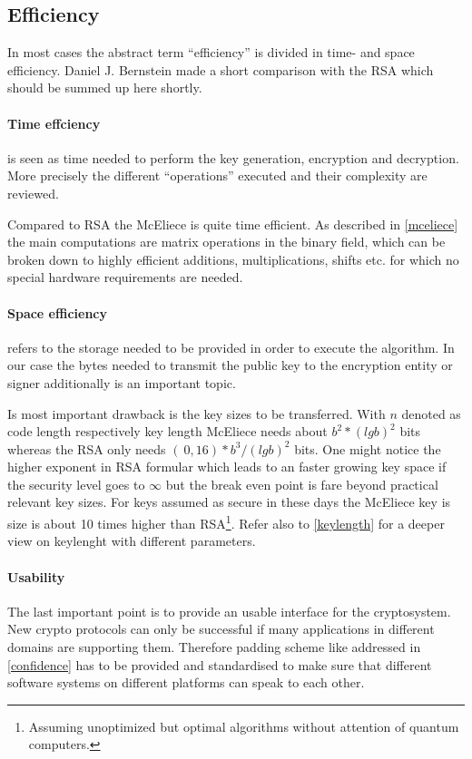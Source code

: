 \subsection*{Efficiency}
In most cases the abstract term ``efficiency'' is divided in time- and space efficiency. Daniel J. Bernstein made \cite{bernstein2009introduction} a short comparison with the RSA which should be summed up here shortly. 

\paragraph*{Time effciency} is seen as time needed to perform the key generation, encryption and decryption. More precisely the different ``operations'' executed and their complexity are reviewed. 

Compared to RSA the McEliece is quite time efficient. As described in \autoref{mceliece} the main computations are matrix operations in the binary field, which can be broken down to highly efficient additions, multiplications, shifts etc. for which no special hardware requirements are needed\cite{bernstein2009introduction}.

\paragraph*{Space efficiency} \label{space_efficiency} refers to the storage needed to be provided in order to execute the algorithm. In our case the bytes needed to transmit the public key to the encryption entity or signer additionally is an important topic. 

Is most important drawback is the key sizes to be transferred. With $n$ denoted as code length respectively key length McEliece needs about $b^2*(lg b)^2$ bits whereas the RSA only needs $(~0,16)*b^3/(lg b)^2$ bits. One might notice the higher exponent in RSA formular which leads to an faster growing key space if the security level goes to $\infty$ but the break even point  is fare beyond practical relevant key sizes. For keys assumed as secure in these days the McEliece key is size is about 10 times higher than RSA\footnote{Assuming unoptimized but optimal algorithms without attention of quantum computers.}. Refer also to \autoref{keylength} for a deeper view on keylenght with different parameters.

\paragraph*{Usability}
The last important point is to provide an usable interface for the cryptosystem. New crypto protocols can only be successful if many applications in different domains are supporting them. Therefore padding scheme like addressed in \autoref{confidence} has to be provided and standardised to make sure that different software systems on different platforms can speak to each other. 

